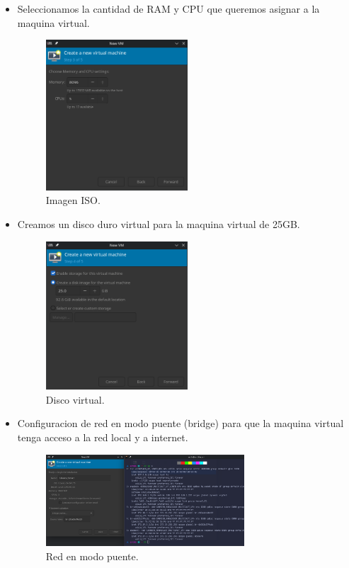 \documentclass[a4paper,12pt]{article}
\begin{document}
\begin{itemize}
        \item Seleccionamos la cantidad de RAM y CPU que queremos asignar a la maquina virtual.
        
        
        \begin{figure}[h!]
            \centering
            \includegraphics[width=0.5\textwidth]{5.png}
            \caption{Imagen ISO.}

        \end{figure}

        \item Creamos un disco duro virtual para la maquina virtual de 25GB.
        
        \begin{figure}[h!]
            \centering
            \includegraphics[width=0.5\textwidth]{6.png}
            \caption{Disco virtual.}
        \end{figure}
    
        \item Configuracion de red en modo puente (bridge) para que la maquina virtual tenga acceso a la red local y a internet.
    
        \begin{figure}[h!]
            \centering
            \includegraphics[width=0.7\textwidth]{7.png}
            \caption{Red en modo puente.}
        \end{figure}


\end{itemize}
\end{document}
